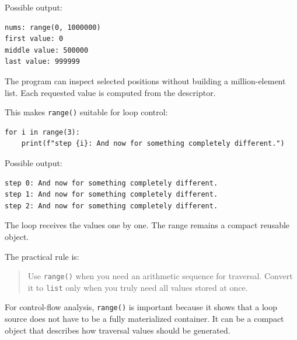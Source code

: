 Possible output:

\begin{verbatim}
nums: range(0, 1000000)
first value: 0
middle value: 500000
last value: 999999
\end{verbatim}

The program can inspect selected positions without building a million-element list. Each requested value is computed from the descriptor.

This makes \texttt{range()} suitable for loop control:

\begin{verbatim}
for i in range(3):
    print(f"step {i}: And now for something completely different.")
\end{verbatim}

Possible output:

\begin{verbatim}
step 0: And now for something completely different.
step 1: And now for something completely different.
step 2: And now for something completely different.
\end{verbatim}

The loop receives the values one by one. The range remains a compact reusable object.

The practical rule is:

\begin{quote}
Use \texttt{range()} when you need an arithmetic sequence for traversal. Convert it to \texttt{list} only when you truly need all values stored at once.
\end{quote}

For control-flow analysis, \texttt{range()} is important because it shows that a loop source does not have to be a fully materialized container. It can be a compact object that describes how traversal values should be generated.